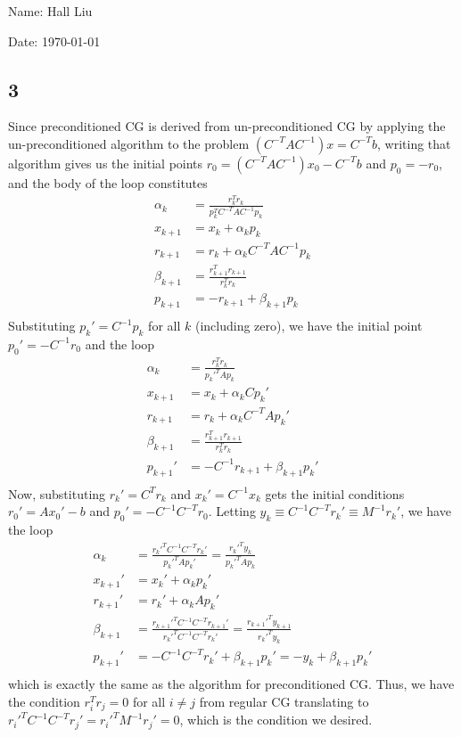 \documentclass{article}
\begin{document}
Name: Hall Liu

Date: \today 
\vspace{1.5cm}

\subsection*{3}
Since preconditioned CG is derived from un-preconditioned CG by applying the un-preconditioned algorithm to the problem $(C^{-T}AC^{-1})x=C^{-T}b$, writing that algorithm gives us the initial points $r_0=(C^{-T}AC^{-1})x_0-C^{-T}b$ and $p_0=-r_0$, and the body of the loop constitutes
\begin{align*}
    \alpha_k&=\frac{r_k^Tr_k}{p_k^TC^{-T}AC^{-1}p_k}\\
    x_{k+1}&=x_k+\alpha_kp_k\\
    r_{k+1}&=r_k+\alpha_kC^{-T}AC^{-1}p_k\\
    \beta_{k+1}&=\frac{r_{k+1}^Tr_{k+1}}{r_k^Tr_k}\\
    p_{k+1}&=-r_{k+1}+\beta_{k+1}p_k\\
\end{align*}
Substituting $p_k'=C^{-1}p_k$ for all $k$ (including zero), we have the initial point $p_0'=-C^{-1}r_0$ and the loop
\begin{align*}
    \alpha_k&=\frac{r_k^Tr_k}{p_k'^TAp_k}\\
    x_{k+1}&=x_k+\alpha_kCp_k'\\
    r_{k+1}&=r_k+\alpha_kC^{-T}Ap_k'\\
    \beta_{k+1}&=\frac{r_{k+1}^Tr_{k+1}}{r_k^Tr_k}\\
    p_{k+1}'&=-C^{-1}r_{k+1}+\beta_{k+1}p_k'\\
\end{align*}
Now, substituting $r_k'=C^Tr_k$ and $x_k'=C^{-1}x_k$ gets the initial conditions $r_0'=Ax_0'-b$ and $p_0'=-C^{-1}C^{-T}r_0$. Letting $y_k\equiv C^{-1}C^{-T}r_k'\equiv M^{-1}r_k'$, we have the loop
\begin{align*}
    \alpha_k&=\frac{r_k'^TC^{-1}C^{-T}r_k'}{p_k'^TAp_k'}=\frac{r_k'^Ty_k}{p_k'^TAp_k}\\
    x_{k+1}'&=x_k'+\alpha_kp_k'\\
    r_{k+1}'&=r_k'+\alpha_kAp_k'\\
    \beta_{k+1}&=\frac{r_{k+1}'^TC^{-1}C^{-T}r_{k+1}'}{r_k'^TC^{-1}C^{-T}r_k'}=\frac{r_{k+1}'^Ty_{k+1}}{r_k'^Ty_k}\\
    p_{k+1}'&=-C^{-1}C^{-T}r_k'+\beta_{k+1}p_k'=-y_k+\beta_{k+1}p_k'\\
\end{align*}
which is exactly the same as the algorithm for preconditioned CG. Thus, we have the condition $r_i^Tr_j=0$ for all $i\neq j$ from regular CG translating to $r_i'^TC^{-1}C^{-T}r_j'=r_i'^TM^{-1}r_j'=0$, which is the condition we desired.
\end{document}
